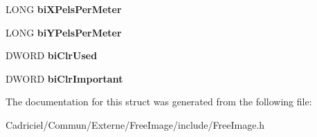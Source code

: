 \begin{DoxyCompactItemize}
\item 
\hypertarget{structtag_b_i_t_m_a_p_i_n_f_o_h_e_a_d_e_r_ae363738b6e92248a7be41f4e7ed55c54}{L\-O\-N\-G {\bfseries bi\-X\-Pels\-Per\-Meter}}\label{structtag_b_i_t_m_a_p_i_n_f_o_h_e_a_d_e_r_ae363738b6e92248a7be41f4e7ed55c54}

\item 
\hypertarget{structtag_b_i_t_m_a_p_i_n_f_o_h_e_a_d_e_r_ac6226594275d045ff0d03849945d920f}{L\-O\-N\-G {\bfseries bi\-Y\-Pels\-Per\-Meter}}\label{structtag_b_i_t_m_a_p_i_n_f_o_h_e_a_d_e_r_ac6226594275d045ff0d03849945d920f}

\item 
\hypertarget{structtag_b_i_t_m_a_p_i_n_f_o_h_e_a_d_e_r_adbf6bd52839895672030a734d2ae752f}{D\-W\-O\-R\-D {\bfseries bi\-Clr\-Used}}\label{structtag_b_i_t_m_a_p_i_n_f_o_h_e_a_d_e_r_adbf6bd52839895672030a734d2ae752f}

\item 
\hypertarget{structtag_b_i_t_m_a_p_i_n_f_o_h_e_a_d_e_r_a637282b108fc8ac3bdf41479f9931ccb}{D\-W\-O\-R\-D {\bfseries bi\-Clr\-Important}}\label{structtag_b_i_t_m_a_p_i_n_f_o_h_e_a_d_e_r_a637282b108fc8ac3bdf41479f9931ccb}

\end{DoxyCompactItemize}


The documentation for this struct was generated from the following file\-:\begin{DoxyCompactItemize}
\item 
Cadriciel/\-Commun/\-Externe/\-Free\-Image/include/Free\-Image.\-h\end{DoxyCompactItemize}
